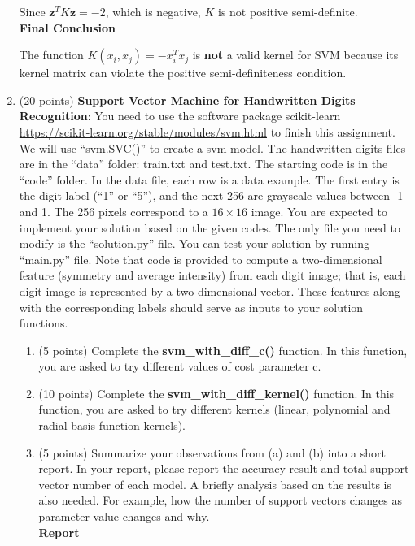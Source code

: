 \documentclass[11pt]{article}
\begin{document}
\begin{enumerate}
   Since \( \mathbf{z}^T K \mathbf{z} = -2 \), which is negative, \( K \) is not positive semi-definite.\\

\textbf{Final Conclusion}

The function \( K(x_i, x_j) = -x_i^T x_j \) is \textbf{not} a valid kernel for SVM because its kernel matrix can violate the positive semi-definiteness condition.


\item (20 points) \textbf{Support Vector Machine for Handwritten
Digits Recognition}: You need to use the software package
scikit-learn
\href{https://scikit-learn.org/stable/modules/svm.html}{https://scikit-learn.org/stable/modules/svm.html}
to finish this assignment. We will use ``svm.SVC()'' to create a
svm model. The handwritten digits files are in the ``data''
folder: train.txt and test.txt. The starting code is in the
``code'' folder. In the data file, each row is a data example.
The first entry is the digit label (``1'' or ``5''), and the next
256 are grayscale values between -1 and 1. The 256 pixels
correspond to a $16\times16$ image. You are expected to implement
your solution based on the given codes. The only file you need to
modify is the ``solution.py'' file. You can test your solution by
running ``main.py'' file. Note that code is provided to compute a
two-dimensional feature (symmetry and average intensity) from
each digit image; that is, each digit image is represented by a
two-dimensional vector. These features along with the
corresponding labels should serve as inputs to your solution
functions.

\begin{enumerate}
\item (5 points) Complete the \textbf{svm\_with\_diff\_c()}
function. In this function, you are asked to try different values
of cost parameter c.
\item (10 points) Complete the \textbf{svm\_with\_diff\_kernel()}
function. In this function, you are asked to try different
kernels (linear, polynomial and radial basis function kernels).
\item (5 points) Summarize your observations from (a) and (b)
into a short report. In your report, please report the accuracy
result and total support vector number of each model. A briefly
analysis based on the results is also needed. For example, how
the number of support vectors changes as parameter value changes
and why.\\

\textbf{Report}


\end{enumerate}
\end{enumerate}
\end{document}
